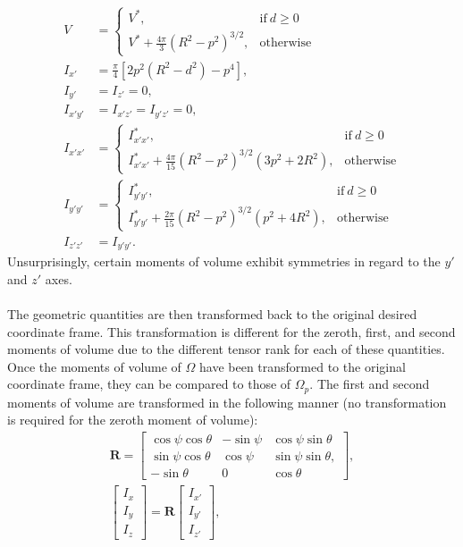 \begin{align} 
V &=  \begin{cases}
      V^*, & \text{if}\ d \geq 0 \\
      V^* + \frac{4\pi}{3}\left(R^2-p^2\right)^{3/2}, & \text{otherwise}
    \end{cases}\\
I_{x'} &= \frac{\pi}{4}\left[2p^2(R^2-d^2) - p^4 \right],\\
I_{y'} &= I_{z'} = 0, \\
I_{x'y'} &= I_{x'z'} = I_{y'z'} = 0, \\
I_{x'x'} &=  \begin{cases}
      I^*_{x'x'}, & \text{if}\ d \geq 0 \\
       I^*_{x'x'} + \frac{4\pi}{15}(R^2-p^2)^{3/2}(3p^2+2R^2), & \text{otherwise}
    \end{cases} \\
I_{y'y'} &=  \begin{cases}
     I^*_{y'y'}, & \text{if}\ d \geq 0 \\
     I^*_{y'y'} + \frac{2\pi}{15}(R^2-p^2)^{3/2}(p^2+4R^2), & \text{otherwise}
    \end{cases} \\
I_{z'z'} &= I_{y'y'}.
\end{align}
Unsurprisingly, certain moments of volume exhibit symmetries in regard to the $y'$ and $z'$ axes. \\ \\
%
The geometric quantities are then transformed back to the original desired coordinate frame. This transformation is different for the zeroth, first, and second moments of volume due to the different tensor rank for each of these quantities. Once the moments of volume of $\Omega$ have been transformed to the original coordinate frame, they can be compared to those of $\Omega_p$. The first and second moments of volume are transformed in the following manner (no transformation is required for the zeroth moment of volume):
\begin{gather}
\bm{R} = \left[\begin{array} {ccc} {\cos\psi\cos\theta} & {-\sin\psi} & {\cos\psi\sin\theta}\\ {\sin\psi\cos\theta} & {\cos\psi} & {\sin\psi\sin\theta}, \\
{-\sin\theta} & {0} & {\cos\theta}\end{array} \right], \\
\left[\begin{array} {ccc} {I_x} \\ {I_y} \\ {I_z} \end{array} \right] = \bm{R} \left[\begin{array} {ccc} {I_{x'}} \\ {I_{y'}} \\ {I_{z'}} \end{array} \right],
\end{gather}
